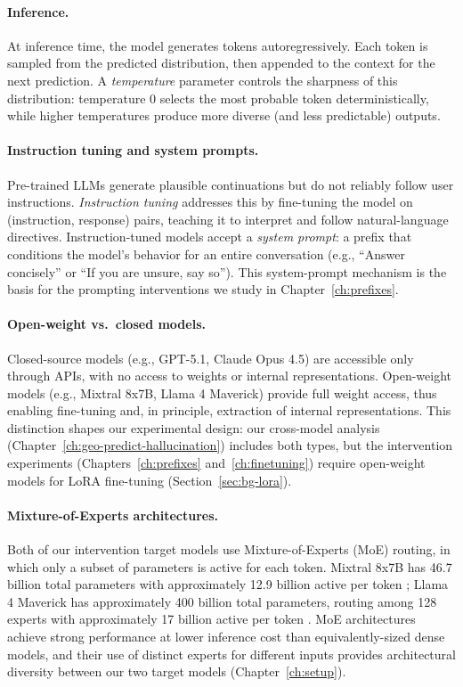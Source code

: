 \paragraph{Inference.} At inference time, the model generates tokens autoregressively. Each token is sampled from the predicted distribution, then appended to the context for the next prediction. A \emph{temperature} parameter controls the sharpness of this distribution: temperature 0 selects the most probable token deterministically, while higher temperatures produce more diverse (and less predictable) outputs.

\paragraph{Instruction tuning and system prompts.} Pre-trained LLMs generate plausible continuations but do not reliably follow user instructions. \emph{Instruction tuning} \citep{ouyang2022training} addresses this by fine-tuning the model on (instruction, response) pairs, teaching it to interpret and follow natural-language directives. Instruction-tuned models accept a \emph{system prompt}: a prefix that conditions the model's behavior for an entire conversation (e.g., ``Answer concisely'' or ``If you are unsure, say so''). This system-prompt mechanism is the basis for the prompting interventions we study in Chapter~\ref{ch:prefixes}.

\paragraph{Open-weight vs.\ closed models.} Closed-source models (e.g., GPT-5.1, Claude Opus 4.5) are accessible only through APIs, with no access to weights or internal representations. Open-weight models (e.g., Mixtral 8x7B, Llama 4 Maverick) provide full weight access, thus enabling fine-tuning and, in principle, extraction of internal representations. This distinction shapes our experimental design: our cross-model analysis (Chapter~\ref{ch:geo-predict-hallucination}) includes both types, but the intervention experiments (Chapters~\ref{ch:prefixes} and~\ref{ch:finetuning}) require open-weight models for LoRA fine-tuning (Section~\ref{sec:bg-lora}).

\paragraph{Mixture-of-Experts architectures.} Both of our intervention target models use Mixture-of-Experts (MoE) routing, in which only a subset of parameters is active for each token. Mixtral 8x7B has 46.7 billion total parameters with approximately 12.9 billion active per token \citep{jiang2024mixtral}; Llama 4 Maverick has approximately 400 billion total parameters, routing among 128 experts with approximately 17 billion active per token \citep{meta2025llama4}. MoE architectures achieve strong performance at lower inference cost than equivalently-sized dense models, and their use of distinct experts for different inputs provides architectural diversity between our two target models (Chapter~\ref{ch:setup}).

